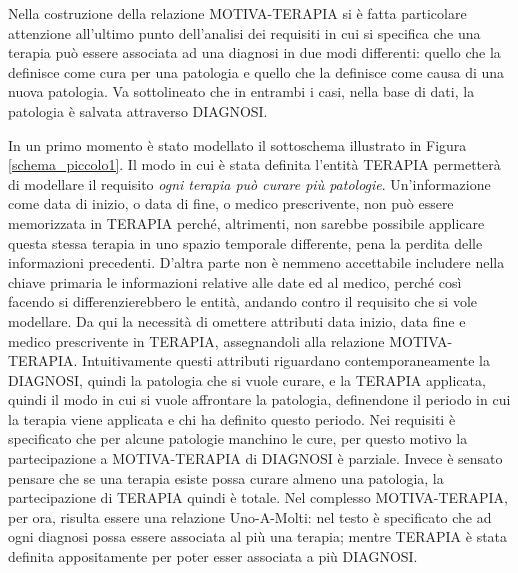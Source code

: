 \documentclass{article}
\begin{document}
                 

Nella costruzione della relazione MOTIVA-TERAPIA si è fatta particolare
attenzione all'ultimo punto dell'analisi dei requisiti in cui si specifica che
una terapia può essere associata ad una diagnosi in due modi differenti: quello
che la definisce come cura per una patologia e quello che la definisce come
causa di una nuova patologia.  Va sottolineato che in entrambi i casi, nella
base di dati, la patologia è salvata attraverso DIAGNOSI.

In un primo momento è stato modellato il sottoschema illustrato in Figura
\ref{schema_piccolo1}.  Il modo in cui è stata definita l'entità TERAPIA
permetterà di modellare il requisito \textit{ogni terapia può curare più
patologie}.  Un'informazione come data di inizio, o data di fine, o medico
prescrivente, non può essere memorizzata in TERAPIA perché, altrimenti, non
sarebbe possibile applicare questa stessa terapia in uno spazio temporale
differente, pena la perdita delle informazioni precedenti. D'altra parte non è
nemmeno accettabile includere nella chiave primaria le informazioni relative
alle date ed al medico, perché così facendo si differenzierebbero le entità,
andando contro il requisito che si vole modellare.  Da qui la necessità di
omettere attributi data inizio, data fine e medico prescrivente in TERAPIA,
assegnandoli alla relazione MOTIVA-TERAPIA.  Intuitivamente questi attributi
riguardano contemporaneamente la DIAGNOSI, quindi la patologia che si vuole
curare, e la TERAPIA applicata, quindi il modo in cui si vuole affrontare la
patologia, definendone il periodo in cui la terapia viene applicata e chi ha
definito questo periodo.  Nei requisiti è specificato che per alcune patologie
manchino le cure, per questo motivo la partecipazione a MOTIVA-TERAPIA di
DIAGNOSI è parziale.  Invece è sensato pensare che se una terapia esiste possa
curare almeno una patologia, la partecipazione di TERAPIA quindi è totale.  Nel
complesso MOTIVA-TERAPIA, per ora, risulta essere una relazione Uno-A-Molti:
nel testo è specificato che ad ogni diagnosi possa essere associata al più una
terapia; mentre TERAPIA è stata definita appositamente per poter esser
associata a più DIAGNOSI.
\end{document}
